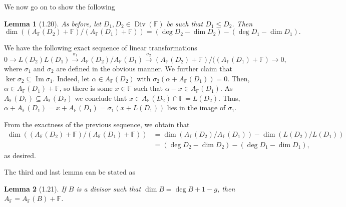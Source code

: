 \documentclass[11pt]{article}
\makeatletter
\theoremstyle{scplain}
\newtheorem*{lemma}{Lemma}
\renewenvironment{proof}[1][\proofname]{%
  \par\pushQED{\qed}\normalfont\topsep6\p@\@plus6\p@\relax
  \trivlist\item[\hskip\labelsep\scshape #1\@addpunct{.}]\ignorespaces}%
  {\popQED\endtrivlist\@endpefalse}
\DeclareMathOperator{\Div}{Div}
\makeatother
\begin{document}
We now go on to show the following

\begin{lemma}[1.20]
As before, let $D_1,D_2 \in \Div(\mathbb{F})$ be such that $D_1 \leq D_2$.
Then
\[
  \dim((A_{\mathbb{F}}(D_2)+\mathbb{F})/(A_{\mathbb{F}}(D_1)+\mathbb{F}))
    = (\deg D_2-\dim D_2) - (\deg D_1-\dim D_1).
\]
\end{lemma}

\begin{proof}
We have the following exact sequence of linear transformations
{\small
\[
  0 \longrightarrow L(D_2)L(D_1)
    \xrightarrow{\ \sigma_1\ } A_{\mathbb{F}}(D_2)/A_{\mathbb{F}}(D_1)
    \xrightarrow{\ \sigma_2\ }
    (A_{\mathbb{F}}(D_2)+\mathbb{F})/((A_{\mathbb{F}}(D_1)+\mathbb{F})
    \longrightarrow 0,
\]
}
where $\sigma_1$ and $\sigma_2$ are defined in the obvious manner. We further
claim that $\ker\sigma_2 \subseteq \operatorname{Im}\sigma_1$. Indeed, let
$\alpha \in A_{\mathbb{F}}(D_2)$ with
$\sigma_2(\alpha+A_{\mathbb{F}}(D_1))=0$. Then,
$\alpha \in A_{\mathbb{F}}(D_1)+\mathbb{F}$, so there is some
$x \in \mathbb{F}$ such that $\alpha-x \in A_{\mathbb{F}}(D_1)$. As
$A_{\mathbb{F}}(D_1) \subseteq A_{\mathbb{F}}(D_2)$ we conclude that
$x \in A_{\mathbb{F}}(D_2) \cap \mathbb{F} = L(D_2)$. Thus,
$\alpha+A_{\mathbb{F}}(D_1) = x+A_{\mathbb{F}}(D_1)
= \sigma_1(x+L(D_1))$ lies in the image of $\sigma_1$.

From the exactness of the previous sequence, we obtain that
{\small
\[
\begin{split}
  \dim((A_{\mathbb{F}}(D_2)+\mathbb{F})/(A_{\mathbb{F}}(D_1)+\mathbb{F}))
  &= \dim(A_{\mathbb{F}}(D_2)/A_{\mathbb{F}}(D_1))
     - \dim(L(D_2)/L(D_1)) \\
  &= (\deg D_2-\dim D_2) - (\deg D_1-\dim D_1),
\end{split}
\]
}
as desired.
\end{proof}

The third and last lemma can be stated as

\begin{lemma}[1.21]
If $B$ is a divisor such that $\dim B = \deg B + 1 - g$, then
$A_{\mathbb{F}} = A_{\mathbb{F}}(B) + \mathbb{F}$.
\end{lemma}
\end{document}
